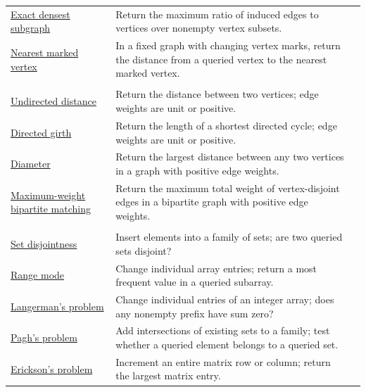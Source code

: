 \documentclass[11pt]{article}
\theoremstyle{plain}
\theoremstyle{definition}
\theoremstyle{remark}
\begin{document}
\begin{longtable}{@{}>{\raggedright\arraybackslash}p{}>{\raggedright\arraybackslash}p{}>{\raggedright\arraybackslash}p{}@{}}
\addlinespace[2pt]
\hyperref[sec:app-density]{Exact densest subgraph} & Return the maximum ratio of induced edges to vertices over nonempty vertex subsets. & \cite{henzinger_unifying_2015} \\
\addlinespace[2pt]
\hyperref[sec:app-marked-distance]{Nearest marked vertex} & In a fixed graph with changing vertex marks, return the distance from a queried vertex to the nearest marked vertex. & \cite{henzinger_unifying_2015} \\
\midrule
\multicolumn{3}{@{}l}{\emph{Planar graphs (edge insertions)}}\\*
\hyperref[sec:planar-distance]{Undirected distance} & Return the distance between two vertices; edge weights are unit or positive. & \cite{abboud_popular_2016} \\
\addlinespace[2pt]
\hyperref[sec:planar-girth]{Directed girth} & Return the length of a shortest directed cycle; edge weights are unit or positive. & \cite{abboud_popular_2016} \\
\addlinespace[2pt]
\hyperref[sec:planar-diameter]{Diameter} & Return the largest distance between any two vertices in a graph with positive edge weights. & \cite{abboud_popular_2016} \\
\addlinespace[2pt]
\hyperref[sec:planar-matching]{Maximum-weight bipartite matching} & Return the maximum total weight of vertex-disjoint edges in a bipartite graph with positive edge weights. & \cite{abboud_popular_2016} \\
\midrule
\multicolumn{3}{@{}l}{\emph{Sets and arrays}}\\*
\hyperref[sec:set-disjointness]{Set disjointness} & Insert elements into a family of sets; are two queried sets disjoint? & \cite{kopelowitz_dynamic_2015} \\
\addlinespace[2pt]
\hyperref[sec:range-mode]{Range mode} & Change individual array entries; return a most frequent value in a queried subarray. & \cite{chan_linear-space_2014} \\
\addlinespace[2pt]
\hyperref[sec:langerman]{Langerman's problem} & Change individual entries of an integer array; does any nonempty prefix have sum zero? & \cite{patrascu_mihai_towards_2010} \\
\addlinespace[2pt]
\hyperref[sec:pagh]{Pagh's problem} & Add intersections of existing sets to a family; test whether a queried element belongs to a queried set. & \cite{patrascu_mihai_towards_2010} \\
\addlinespace[2pt]
\hyperref[sec:erickson]{Erickson's problem} & Increment an entire matrix row or column; return the largest matrix entry. & \cite{patrascu_mihai_towards_2010,ko_omega_2026} \\

\end{longtable}
\end{document}
